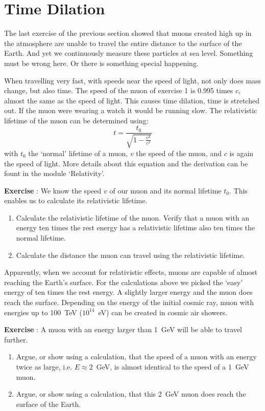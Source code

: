 \section{Time Dilation}
The last exercise of the previous section showed that muons created high up in the atmosphere are unable to travel the entire distance to the surface of the Earth. And yet we continuously measure these particles at sea level. Something must be wrong here. Or there is something special happening.

When travelling very fast, with speeds near the speed of light, not only does mass change, but also time. The speed of the muon of exercise 1 is 0.995 times $c$, almost the same as the speed of light. This causes time dilation, time is stretched out. If the muon were wearing a watch it would be running slow. The relativistic lifetime of the muon can be determined using:
\begin{equation}
t = \frac{t_0}{\sqrt{1 - \frac{v^2}{c^2}}}
\end{equation}
with $t_0$ the `normal' lifetime of a muon, $v$ the speed of the muon, and $c$ is again the speed of light. More details about this equation and the derivation can be fount in the module `Relativity'.

\begin{shaded}
\textbf{Exercise \theExercise {}} : We know the speed $v$ of our muon and its normal lifetime $t_0$. This enables us to calculate its relativistic lifetime.
\begin{enumerate}[-]
\item Calculate the relativistic lifetime of the muon. Verify that a muon with an energy ten times the rest energy has a relativistic lifetime also ten times the normal lifetime.
\item Calculate the distance the muon can travel using the relativistic lifetime.
\end{enumerate}\end{shaded}

Apparently, when we account for relativistic effects, muons are capable of almost reaching the Earth's surface. For the calculations above we picked the `easy' energy of ten times the rest energy. A slightly larger energy and the muon does reach the surface. Depending on the energy of the initial cosmic ray, muon with energies up to 100~TeV ($10^{14}$~eV) can be created in cosmic air showers.

\begin{shaded}
\textbf{Exercise \theExercise {}} : A muon with an energy larger than 1~GeV will be able to travel further.
\begin{enumerate}[-]
\item Argue, or show using a calculation, that the speed of a muon with an energy twice as large, i.e. $E \approx 2$~GeV, is almost identical to the speed of a 1~GeV muon.
\item Argue, or show using a calculation, that this 2~GeV muon does reach the surface of the Earth.
\end{enumerate}\end{shaded}

